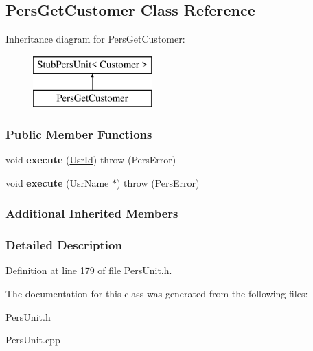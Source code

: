 \hypertarget{classPersGetCustomer}{\subsection{Pers\-Get\-Customer Class Reference}
\label{df/dac/classPersGetCustomer}
}
Inheritance diagram for Pers\-Get\-Customer\-:\begin{figure}[H]
\begin{center}
\leavevmode
\includegraphics[height=2.000000cm]{df/dac/classPersGetCustomer}
\end{center}
\end{figure}
\subsubsection*{Public Member Functions}
\begin{DoxyCompactItemize}
\item 
\hypertarget{classPersGetCustomer_a67103ecb49882a8287849fa649cc9047}{void {\bfseries execute} (\hyperlink{classUsrId}{Usr\-Id})  throw (\-Pers\-Error)}\label{df/dac/classPersGetCustomer_a67103ecb49882a8287849fa649cc9047}

\item 
\hypertarget{classPersGetCustomer_a8d72d5fab3bc9c78b1e4af33e535b89f}{void {\bfseries execute} (\hyperlink{classUsrName}{Usr\-Name} $\ast$)  throw (\-Pers\-Error)}\label{df/dac/classPersGetCustomer_a8d72d5fab3bc9c78b1e4af33e535b89f}

\end{DoxyCompactItemize}
\subsubsection*{Additional Inherited Members}


\subsubsection{Detailed Description}


Definition at line 179 of file Pers\-Unit.\-h.



The documentation for this class was generated from the following files\-:\begin{DoxyCompactItemize}
\item 
Pers\-Unit.\-h\item 
Pers\-Unit.\-cpp\end{DoxyCompactItemize}
